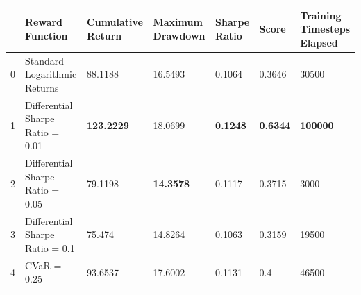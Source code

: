 \begin{tabular}{lllllll}
\toprule
 & Reward Function & Cumulative Return & Maximum Drawdown & Sharpe Ratio & Score & Training Timesteps Elapsed \\
\midrule
0 & Standard Logarithmic Returns & 88.1188 & 16.5493 & 0.1064 & 0.3646 & 30500 \\
1 & Differential Sharpe Ratio = 0.01 & \textbf{123.2229} & 18.0699 & \textbf{0.1248} & \textbf{0.6344} & \textbf{100000} \\
2 & Differential Sharpe Ratio = 0.05 & 79.1198 & \textbf{14.3578} & 0.1117 & 0.3715 & 3000 \\
3 & Differential Sharpe Ratio = 0.1 & 75.474 & 14.8264 & 0.1063 & 0.3159 & 19500 \\
4 & CVaR = 0.25 & 93.6537 & 17.6002 & 0.1131 & 0.4 & 46500 \\
\bottomrule
\end{tabular}
